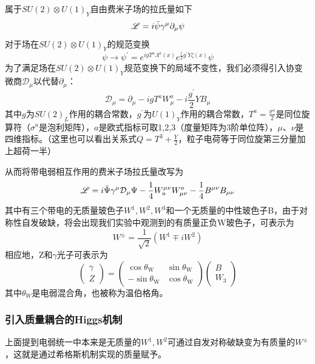 属于$SU(2)\otimes U(1)_Y$自由费米子场的拉氏量如下
\begin{equation}
    \mathscr{L}=i\Bar{\psi}\gamma^\mu\partial_\mu \psi
\end{equation}
对于场在$SU(2)\otimes U(1)_Y$的规范变换
\begin{equation}
    \psi \to\psi^\prime=e^{igT^a\Lambda^a(x)}e^{\frac{i}{2}g^\prime Y\zeta(x)}\psi
\end{equation}
为了满足场在$SU(2)\otimes U(1)_Y$规范变换下的局域不变性，我们必须得引入协变微商$\mathcal{D}_\mu$以代替$\partial_\mu$：
\begin{equation}
    \mathcal{D}_\mu=\partial_\mu -igT^aW_\mu^a-i\frac{g^\prime}{2} Y B_\mu
\end{equation}
其中$g$为$SU(2)_L$作用的耦合常数，$g^\prime$为$U(1)_Y$作用的耦合常数，$\displaystyle T^a=\frac{\sigma^a}{2}$是同位旋算符（$\sigma^a$是泡利矩阵），$a$是欧式指标可取1,2,3（度量矩阵为3阶单位阵），$\mu$、$\nu$是四维指标。（这里也可以看出关系式$\displaystyle Q=T^3+\frac{Y}{2}$，粒子电荷等于同位旋第三分量加上超荷一半）

从而将带电弱相互作用的费米子场拉氏量改写为
\begin{equation}
    \mathscr{L}=i\Bar{\Psi}\gamma^\mu\mathcal{D}_\mu \Psi-\frac{1}{4}W^{\mu\nu}_a W^a_{\mu\nu}-\frac{1}{4}B^{\mu\nu}B_{\mu\nu}
\end{equation}
其中有三个带电的无质量玻色子$W^1,W^2,W^3$和一个无质量的中性玻色子B，由于对称性自发破缺，将会出现我们实验中观测到的有质量正负W玻色子，可表示为
\begin{equation}
    W^{\pm}=\frac{1}{\sqrt{2}}(W^1\mp iW^2)
\end{equation}
相应地，Z和$\gamma$光子可表示为
\begin{equation}
    \begin{pmatrix}
\gamma \\
Z \end{pmatrix} = \begin{pmatrix}
\cos \theta_\text{W} & \sin \theta_\text{W} \\
-\sin \theta_\text{W} & \cos \theta_\text{W} \end{pmatrix} \begin{pmatrix}
B \\
W_3 \end{pmatrix}
\end{equation}
其中$\theta_W$是电弱混合角，也被称为温伯格角。

\subsubsection{引入质量耦合的Higgs机制}
上面提到电弱统一中本来是无质量的$W^1,W^2$可通过自发对称破缺变为有质量的$W^\pm$，这就是通过希格斯机制实现的质量赋予。

